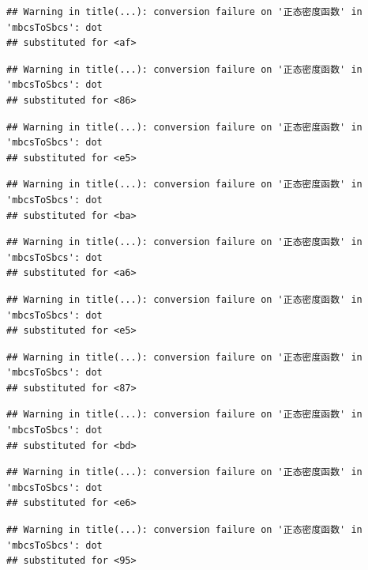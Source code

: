 \documentclass[
]{book}
\begin{document}
\begin{verbatim}
## Warning in title(...): conversion failure on '正态密度函数' in 'mbcsToSbcs': dot
## substituted for <af>
\end{verbatim}

\begin{verbatim}
## Warning in title(...): conversion failure on '正态密度函数' in 'mbcsToSbcs': dot
## substituted for <86>
\end{verbatim}

\begin{verbatim}
## Warning in title(...): conversion failure on '正态密度函数' in 'mbcsToSbcs': dot
## substituted for <e5>
\end{verbatim}

\begin{verbatim}
## Warning in title(...): conversion failure on '正态密度函数' in 'mbcsToSbcs': dot
## substituted for <ba>
\end{verbatim}

\begin{verbatim}
## Warning in title(...): conversion failure on '正态密度函数' in 'mbcsToSbcs': dot
## substituted for <a6>
\end{verbatim}

\begin{verbatim}
## Warning in title(...): conversion failure on '正态密度函数' in 'mbcsToSbcs': dot
## substituted for <e5>
\end{verbatim}

\begin{verbatim}
## Warning in title(...): conversion failure on '正态密度函数' in 'mbcsToSbcs': dot
## substituted for <87>
\end{verbatim}

\begin{verbatim}
## Warning in title(...): conversion failure on '正态密度函数' in 'mbcsToSbcs': dot
## substituted for <bd>
\end{verbatim}

\begin{verbatim}
## Warning in title(...): conversion failure on '正态密度函数' in 'mbcsToSbcs': dot
## substituted for <e6>
\end{verbatim}

\begin{verbatim}
## Warning in title(...): conversion failure on '正态密度函数' in 'mbcsToSbcs': dot
## substituted for <95>
\end{verbatim}
\end{document}
